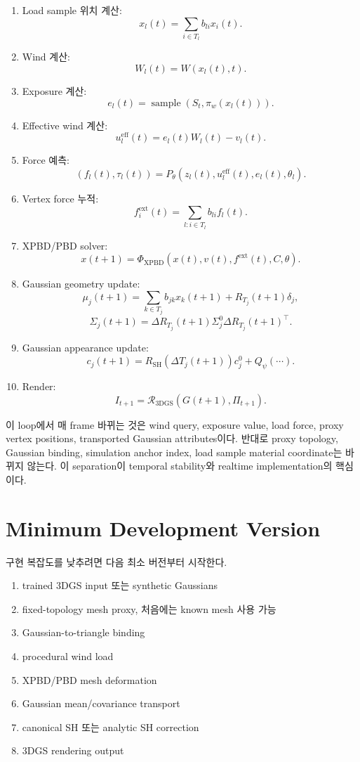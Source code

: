 \documentclass[11pt,a4paper]{article}
\begin{document}
\begin{enumerate}[leftmargin=1.5em]
    \item Load sample 위치 계산:
    \[
    x_l(t)=\sum_{i\in T_l}b_{li}x_i(t).
    \]
    \item Wind 계산:
    \[
    W_l(t)=W(x_l(t),t).
    \]
    \item Exposure 계산:
    \[
    e_l(t)=\operatorname{sample}(S_t,\pi_w(x_l(t))).
    \]
    \item Effective wind 계산:
    \[
    u_l^{\mathrm{eff}}(t)=e_l(t)W_l(t)-v_l(t).
    \]
    \item Force 예측:
    \[
    (f_l(t),\tau_l(t))=P_\theta(z_l(t),u_l^{\mathrm{eff}}(t),e_l(t),\theta_l).
    \]
    \item Vertex force 누적:
    \[
    f_i^{\mathrm{ext}}(t)=\sum_{l:i\in T_l}b_{li}f_l(t).
    \]
    \item XPBD/PBD solver:
    \[
    x(t+1)=\Phi_{\mathrm{XPBD}}(x(t),v(t),f^{\mathrm{ext}}(t),C,\theta).
    \]
    \item Gaussian geometry update:
    \[
    \mu_j(t+1)=\sum_{k\in T_j}b_{jk}x_k(t+1)+R_{T_j}(t+1)\delta_j,
    \]
    \[
    \Sigma_j(t+1)=\Delta R_{T_j}(t+1)\Sigma_j^0\Delta R_{T_j}(t+1)^\top.
    \]
    \item Gaussian appearance update:
    \[
    c_j(t+1)=R_{\mathrm{SH}}(\Delta T_j(t+1))c_j^0+Q_\psi(\cdots).
    \]
    \item Render:
    \[
	    I_{t+1}=\mathcal{R}_{\mathrm{3DGS}}(G(t+1),\Pi_{t+1}).
	    \]
\end{enumerate}

이 loop에서 매 frame 바뀌는 것은 wind query, exposure value, load force, proxy vertex positions, transported Gaussian attributes이다.
반대로 proxy topology, Gaussian binding, simulation anchor index, load sample material coordinate는 바뀌지 않는다.
이 separation이 temporal stability와 realtime implementation의 핵심이다.

\section{Minimum Development Version}

구현 복잡도를 낮추려면 다음 최소 버전부터 시작한다.

\begin{enumerate}[leftmargin=1.5em]
    \item trained 3DGS input 또는 synthetic Gaussians
    \item fixed-topology mesh proxy, 처음에는 known mesh 사용 가능
    \item Gaussian-to-triangle binding
    \item procedural wind load
    \item XPBD/PBD mesh deformation
    \item Gaussian mean/covariance transport
    \item canonical SH 또는 analytic SH correction
    \item 3DGS rendering output
\end{enumerate}
\end{document}
